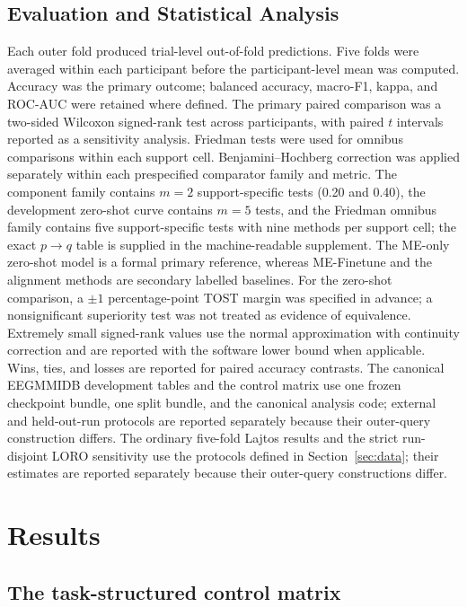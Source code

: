 \documentclass[preprint,12pt]{elsarticle}
\begin{document}
\subsection{Evaluation and Statistical Analysis}
Each outer fold produced trial-level out-of-fold predictions. Five folds were averaged within each participant before the participant-level mean was computed. Accuracy was the primary outcome; balanced accuracy, macro-F1, kappa, and ROC-AUC were retained where defined. The primary paired comparison was a two-sided Wilcoxon signed-rank test across participants, with paired $t$ intervals reported as a sensitivity analysis. Friedman tests were used for omnibus comparisons within each support cell. Benjamini--Hochberg correction was applied separately within each prespecified comparator family and metric. The component family contains $m=2$ support-specific tests (0.20 and 0.40), the development zero-shot curve contains $m=5$ tests, and the Friedman omnibus family contains five support-specific tests with nine methods per support cell; the exact $p\rightarrow q$ table is supplied in the machine-readable supplement. The ME-only zero-shot model is a formal primary reference, whereas ME-Finetune and the alignment methods are secondary labelled baselines. For the zero-shot comparison, a $\pm1$ percentage-point TOST margin was specified in advance; a nonsignificant superiority test was not treated as evidence of equivalence. Extremely small signed-rank values use the normal approximation with continuity correction and are reported with the software lower bound when applicable. Wins, ties, and losses are reported for paired accuracy contrasts. The canonical EEGMMIDB development tables and the control matrix use one frozen checkpoint bundle, one split bundle, and the canonical analysis code; external and held-out-run protocols are reported separately because their outer-query construction differs. The ordinary five-fold Lajtos results and the strict run-disjoint LORO sensitivity use the protocols defined in Section~\ref{sec:data}; their estimates are reported separately because their outer-query constructions differ.
\section{Results}


\subsection{The task-structured control matrix}

\end{document}

